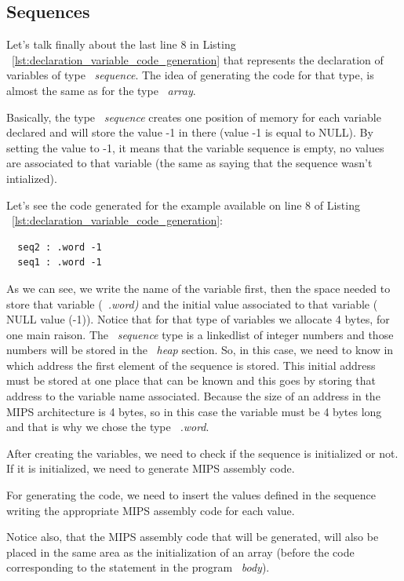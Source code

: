 \documentclass[
  oneside,
  11pt, a4paper,
  footinclude=true,
  headinclude=true,
  cleardoublepage=empty
]{scrbook}
\begin{document}
\subsection*{Sequences}

Let's talk finally about the last line 8 in Listing ~\ref{lst:declaration_variable_code_generation} that represents the declaration of variables of type ~\textit{sequence}. The idea of generating the code for that type, is almost the same as for the type ~\textit{array}.

Basically, the type ~\textit{sequence} creates one position of memory for each variable declared and will store the value -1 in there (value -1 is equal to NULL). By setting the value to -1, it means that the variable sequence is empty, no values are associated to that variable (the same as saying that the sequence wasn't intialized).

Let's see the code generated for the example available on line 8 of Listing ~\ref{lst:declaration_variable_code_generation}:

\begin{lstlisting}
  seq2 : .word -1		
  seq1 : .word -1		
\end{lstlisting}

As we can see, we write the name of the variable first, then the space needed to store that variable (~\textit{.word)} and the initial value associated to that variable ( NULL value (-1)). Notice that for that type of variables we allocate 4 bytes, for one main raison.
The ~\textit{sequence} type is a linkedlist of integer numbers and those numbers will be stored in the ~\textit{heap} section.
So, in this case, we need to know in which address the first element of the sequence is stored. This initial address must be stored at one place that can be known and this goes by storing that address to the variable name associated.
Because the size of an address in the MIPS architecture is 4 bytes, so in this case the variable must be 4 bytes long and that is why we chose the type ~\textit{.word}.

After creating the variables, we need to check if the sequence is initialized or not.
If it is initialized, we need to generate MIPS assembly code. 

For generating the code, we need to insert the values defined in the sequence writing the appropriate MIPS assembly code for each value.

Notice also, that the MIPS assembly code that will be generated, will also be placed in the same area as the initialization of an array (before the code corresponding to the statement in the program ~\textit{body}).
\end{document}
